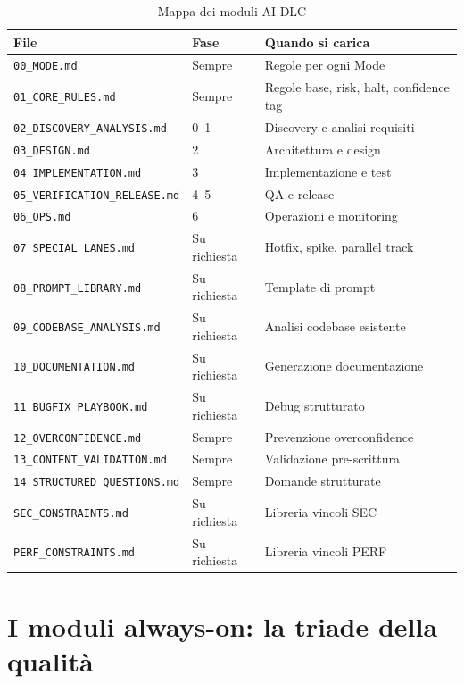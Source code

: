 \begin{table}[htbp]
  \centering
  \begin{tabular}{lll}
    \toprule
    \textbf{File} & \textbf{Fase} & \textbf{Quando si carica} \\
    \midrule
    \texttt{00\_MODE.md} & Sempre & Regole per ogni Mode \\
    \texttt{01\_CORE\_RULES.md} & Sempre & Regole base, risk, halt, confidence tag \\
    \texttt{02\_DISCOVERY\_ANALYSIS.md} & 0--1 & Discovery e analisi requisiti \\
    \texttt{03\_DESIGN.md} & 2 & Architettura e design \\
    \texttt{04\_IMPLEMENTATION.md} & 3 & Implementazione e test \\
    \texttt{05\_VERIFICATION\_RELEASE.md} & 4--5 & QA e release \\
    \texttt{06\_OPS.md} & 6 & Operazioni e monitoring \\
    \texttt{07\_SPECIAL\_LANES.md} & Su richiesta & Hotfix, spike, parallel track \\
    \texttt{08\_PROMPT\_LIBRARY.md} & Su richiesta & Template di prompt \\
    \texttt{09\_CODEBASE\_ANALYSIS.md} & Su richiesta & Analisi codebase esistente \\
    \texttt{10\_DOCUMENTATION.md} & Su richiesta & Generazione documentazione \\
    \texttt{11\_BUGFIX\_PLAYBOOK.md} & Su richiesta & Debug strutturato \\
    \texttt{12\_OVERCONFIDENCE.md} & Sempre & Prevenzione overconfidence \\
    \texttt{13\_CONTENT\_VALIDATION.md} & Sempre & Validazione pre-scrittura \\
    \texttt{14\_STRUCTURED\_QUESTIONS.md} & Sempre & Domande strutturate \\
    \texttt{SEC\_CONSTRAINTS.md} & Su richiesta & Libreria vincoli SEC \\
    \texttt{PERF\_CONSTRAINTS.md} & Su richiesta & Libreria vincoli PERF \\
    \bottomrule
  \end{tabular}
  \caption{Mappa dei moduli AI-DLC}
  \label{tab:12-moduli}
\end{table}

\section{I moduli always-on: la triade della qualità}
\label{sec:12-always-on}

